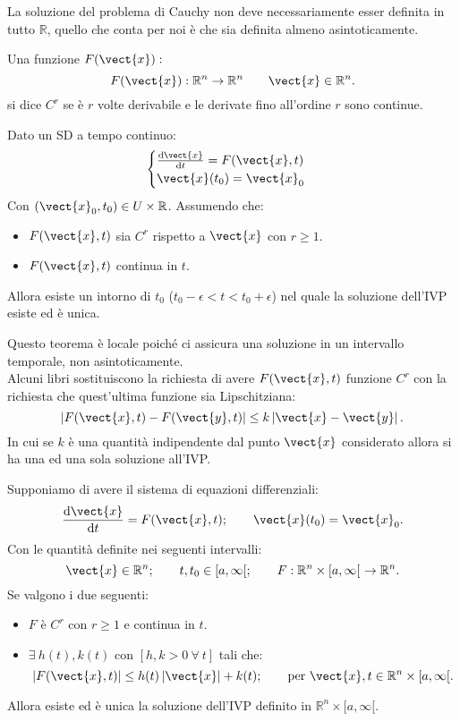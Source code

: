 \noindent
La soluzione del problema di Cauchy non deve necessariamente esser definita in tutto $\mathbb{R}$, quello che conta per noi è che sia definita almeno asintoticamente.
\begin{defn}[Funzione $C^r$]
    Una funzione $F(\vect{x}):$
    \[
	F(\vect{x}): \mathbb{R}^n\to \mathbb{R}^n \qquad \vect{x}\in \mathbb{R}^n
    .\] si dice $C^r$ se è $r$ volte derivabile e le derivate fino all'ordine $r$ sono continue.
\end{defn}
\noindent
\begin{thm}
   Dato un SD a tempo continuo:
   \[
       \begin{cases}
	   \frac{\text{d} \vect{x}}{\text{d} t} = F(\vect{x}, t)\\
	   \vect{x} (t_0) = \vect{x}_0
       \end{cases}
   \] 
   Con $\left(\vect{x}_0, t_0\right) \in U\times \mathbb{R}$. Assumendo che:
   \begin{itemize}
       \item $F(\vect{x},t)$ sia $C^r$ rispetto a $\vect{x}$ con $r\ge 1$.
       \item $F(\vect{x}, t)$ continua in $t$.
   \end{itemize}
   Allora esiste un intorno di $t_0$ ($t_0-\epsilon  < t < t_0+\epsilon$) nel quale la soluzione dell'IVP esiste ed è unica.
\end{thm}
\noindent
Questo teorema è locale poiché ci assicura una soluzione in un intervallo temporale, non asintoticamente.\\
Alcuni libri sostituiscono la richiesta di avere $F(\vect{x}, t)$ funzione $C^r$ con la richiesta che quest'ultima funzione sia Lipschitziana:
\[
    \left|F(\vect{x}, t)-F(\vect{y}, t)\right| \le k \left|\vect{x}-\vect{y}\right|
.\] 
In cui se $k$  è una quantità indipendente dal punto $\vect{x}$  considerato allora si ha una ed una sola soluzione all'IVP.
\begin{thm}
    Supponiamo di avere il sistema di equazioni differenziali:
    \[
	\frac{\text{d} \vect{x}}{\text{d} t} = F(\vect{x},t); \qquad \vect{x}(t_0) = \vect{x}_0
    .\] 
    Con le quantità definite nei seguenti intervalli:
    \[
        \vect{x}\in \mathbb{R}^n; \qquad t, t_0 \in [a,\infty[; \qquad F: \mathbb{R}^n\times [a,\infty[ \ \to \mathbb{R}^n
    .\] 
    Se valgono i due seguenti:
    \begin{itemize}
        \item $F$ è $C^r$ con $r\ge 1$ e continua in $t$.
	\item $\exists \ h(t), k(t)$ con $\left[h, k > 0 \ \forall \ t\right]$ tali che:
	    \[
		\left|F(\vect{x}, t)\right|\le h(t)\left|\vect{x}\right|+k(t); \qquad \text{per } \vect{x}, t \in \mathbb{R}^n\times [a, \infty[
	    .\] 
    \end{itemize}
    Allora esiste ed è unica la soluzione dell'IVP definito in $\mathbb{R}^n\times [a,\infty[$.
\end{thm}
